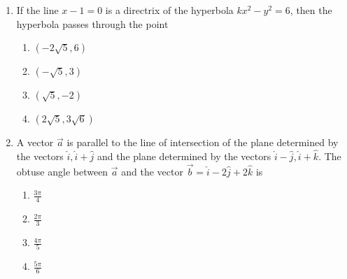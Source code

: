 \documentclass[journal]{IEEEtran}
\newcommand{\brak}[1]{\left( #1 \right)}
\begin{document}
\begin{enumerate}
        \begin{multicols}{4}
        \begin{enumerate}
        \item $12$
        \item $13$
        \item $14$
        \item $16$
        \end{enumerate}
        \end{multicols}

    \item If the line $x - 1 = 0$ is a directrix of the hyperbola $kx^{2} - y^{2} = 6$, then the hyperbola passes through the point

        \begin{multicols}{4}
        \begin{enumerate}
        \item $\brak{-2\sqrt{5}, 6}$
        \item $\brak{-\sqrt{5}, 3}$
        \item $\brak{\sqrt{5}, -2}$
        \item $\brak{2\sqrt{5}, 3\sqrt{6}}$
        \end{enumerate}
        \end{multicols}
        

    \item A vector $\vec{a}$ is parallel to the line of intersection of the plane determined by the vectors $\hat{i}, \hat{i} + \hat{j}$ and the plane determined by the vectors $\hat{i} - \hat{j}, \hat{i} + \hat{k}$. The obtuse angle between $\vec{a}$ and the vector $\vec{b} = \hat{i} - 2\hat{j} + 2\hat{k}$ is

        \begin{multicols}{4}
        \begin{enumerate}
        \item $\frac{3\pi}{4}$
        \item $\frac{2\pi}{3}$
        \item $\frac{4\pi}{5}$
        \item $\frac{5\pi}{6}$
        \end{enumerate}
        \end{multicols}

    
\end{enumerate}
\end{document}
